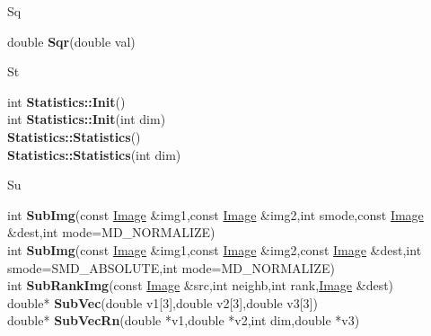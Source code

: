 \documentclass[10pt,titlepage]{article}
\def\functionlistentry#1#2#3#4#5#6{\noindent #1 {\bf #2}(#3) \dotfill #6\\}
\def\letterref#1{}
\def\letterlabel#1{\vspace{0.5cm}\centerline{\Large #1}}
\def\letterlabelend#1{}
\begin{document}
{{\letterlabel{Sq}
\letterref{A}
\letterref{B}
\letterref{C}
\letterref{D}
\letterref{E}
\letterref{F}
\letterref{G}
\letterref{H}
\letterref{I}
\letterref{K}
\letterref{L}
\letterref{M}
\letterref{N}
\letterref{O}
\letterref{P}
\letterref{Q}
\letterref{R}
\letterref{S}
\letterref{T}
\letterref{U}
\letterref{V}
\letterref{W}
\letterref{X}
\letterref{Y}
\letterref{Z}

\letterref{Sc}
\letterref{Se}
\letterref{Sh}
\letterref{Si}
\letterref{Sk}
\letterref{Sm}
\letterref{So}
\letterref{Sp}
\letterref{Sq}
\letterref{St}
\letterref{Su}
\letterlabelend{Sq}
\functionlistentry{double}{Sqr}{double val}{1345}{numeric}{}

\letterlabel{St}
\letterref{A}
\letterref{B}
\letterref{C}
\letterref{D}
\letterref{E}
\letterref{F}
\letterref{G}
\letterref{H}
\letterref{I}
\letterref{K}
\letterref{L}
\letterref{M}
\letterref{N}
\letterref{O}
\letterref{P}
\letterref{Q}
\letterref{R}
\letterref{S}
\letterref{T}
\letterref{U}
\letterref{V}
\letterref{W}
\letterref{X}
\letterref{Y}
\letterref{Z}

\letterref{Sc}
\letterref{Se}
\letterref{Sh}
\letterref{Si}
\letterref{Sk}
\letterref{Sm}
\letterref{So}
\letterref{Sp}
\letterref{Sq}
\letterref{St}
\letterref{Su}
\letterlabelend{St}
\functionlistentry{int}{Statistics::Init}{}{865}{statistics}{}
\functionlistentry{int}{Statistics::Init}{int dim}{866}{statistics}{}
\functionlistentry{}{Statistics::Statistics}{}{863}{statistics}{}
\functionlistentry{}{Statistics::Statistics}{int dim}{864}{statistics}{}

\letterlabel{Su}
\letterref{A}
\letterref{B}
\letterref{C}
\letterref{D}
\letterref{E}
\letterref{F}
\letterref{G}
\letterref{H}
\letterref{I}
\letterref{K}
\letterref{L}
\letterref{M}
\letterref{N}
\letterref{O}
\letterref{P}
\letterref{Q}
\letterref{R}
\letterref{S}
\letterref{T}
\letterref{U}
\letterref{V}
\letterref{W}
\letterref{X}
\letterref{Y}
\letterref{Z}

\letterref{Sc}
\letterref{Se}
\letterref{Sh}
\letterref{Si}
\letterref{Sk}
\letterref{Sm}
\letterref{So}
\letterref{Sp}
\letterref{Sq}
\letterref{St}
\letterref{Su}
\letterlabelend{Su}
\functionlistentry{int}{SubImg}{const \hyperlink{Image}{Image} \&img1,const \hyperlink{Image}{Image} \&img2,int smode,const \hyperlink{Image}{Image} \&dest,int mode=MD\_NORMALIZE}{1088}{processing}{}
\functionlistentry{int}{SubImg}{const \hyperlink{Image}{Image} \&img1,const \hyperlink{Image}{Image} \&img2,const \hyperlink{Image}{Image} \&dest,int smode=SMD\_ABSOLUTE,int mode=MD\_NORMALIZE}{1089}{processing}{}
\functionlistentry{int}{SubRankImg}{const \hyperlink{Image}{Image} \&src,int neighb,int rank,\hyperlink{Image}{Image} \&dest}{387}{filter}{}
\functionlistentry{double*}{SubVec}{double v1[3],double v2[3],double v3[3]}{1559}{obsolet}{}
\functionlistentry{double*}{SubVecRn}{double *v1,double *v2,int dim,double *v3}{1569}{obsolet}{}

}}
\end{document}
